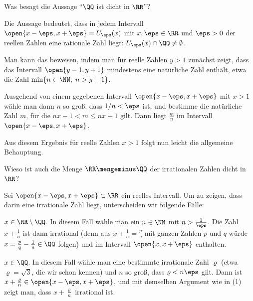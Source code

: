 \begin{frage}
  Was besagt die Aussage "`$\QQ$ ist dicht in $\RR$"'?
\end{frage}

\begin{antwort}
  Die Aussage bedeutet, dass in jedem Intervall 
  $\open{x-\eps,x+\eps}=U_\eps(x)$ 
  mit $x,\eps \in \RR$ und $\eps >0$ 
  der reellen Zahlen eine rationale Zahl liegt: $U_\eps(x) \cap \QQ \not= 
  \emptyset$.  

  Man kann das beweisen, indem man für reelle Zahlen $y>1$ 
  zunächst zeigt, dass das Intervall $\open{y-1,y+1}$ 
  mindestens eine natürliche Zahl enthält, 
  etwa die Zahl $\min \{ n\in\NN;\; n>y-1 \}$. 

  Ausgehend von einem gegebenen Intervall $\open{x-\eps,x+\eps}$ mit $x>1$ 
  wähle man dann $n$ so groß, dass $1/n < \eps$ ist, und bestimme 
  die natürliche Zahl $m$, für die $nx-1 < m \le nx+1$ gilt. Dann liegt 
  $\frac{m}{n}$ im Intervall $\open{x-\eps,x+\eps}$.
  
  Aus diesem Ergebnis für reelle Zahlen $x>1$ folgt nun leicht 
  die allgemeine Behauptung.   
  \AntEnd
\end{antwort}






\begin{frage}
  Wieso ist auch die Menge $\RR\mengeminus\QQ$ der irrationalen Zahlen 
  dicht in $\RR$?
\end{frage}

\begin{antwort}
  Sei $\open{x-\eps,x+\eps}\subset \RR$ ein reelles Intervall. Um zu zeigen, dass 
  darin eine irrationale Zahl liegt, unterscheiden wir folgende 
  Fälle:

  $x\in\RR \setminus \QQ$. In diesem Fall wähle man ein $n\in \NN$ mit 
  $n>\frac{1}{\eps}$. Die Zahl $x+\frac{1}{n}$ ist dann irrational 
  (denn aus $x+\frac{1}{n} = \frac{p}{q}$ 
  mit ganzen Zahlen $p$ und $q$ würde $x=\frac{p}{q}-\frac{1}{n}\in\QQ$ folgen) 
  und im Intervall $\open{x,x+\eps}$ enthalten. 

   $x\in\QQ$. In diesem Fall wähle man eine bestimmte 
  irrationale Zahl $\varrho$ (etwa $\varrho=\sqrt{3}$, die wir schon kennen) 
  und $n$ so groß, dass $\varrho < n\eps$ gilt. 
  Dann ist $x + \frac{\varrho}{n} \in \open{x-\eps,x+\eps}$, und mit demselben 
  Argument wie in (1) zeigt man, dass $x+\frac{\varrho}{n}$ irrational ist.
  \AntEnd
\end{antwort}






